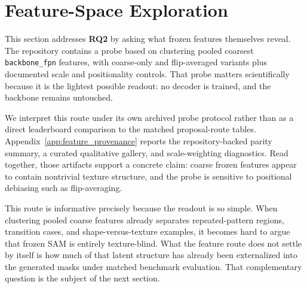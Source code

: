 \section{Feature-Space Exploration}
\label{sec:feature}

This section addresses \textbf{RQ2} by asking what frozen features themselves reveal. The repository contains a probe based on clustering pooled coarsest \texttt{backbone\_fpn} features, with coarse-only and flip-averaged variants plus documented scale and positionality controls. That probe matters scientifically because it is the lightest possible readout: no decoder is trained, and the backbone remains untouched.

We interpret this route under its own archived probe protocol rather than as a direct leaderboard comparison to the matched proposal-route tables. Appendix~\ref{app:feature_provenance} reports the repository-backed parity summary, a curated qualitative gallery, and scale-weighting diagnostics. Read together, those artifacts support a concrete claim: coarse frozen features appear to contain nontrivial texture structure, and the probe is sensitive to positional debiasing such as flip-averaging.

This route is informative precisely because the readout is so simple. When clustering pooled coarse features already separates repeated-pattern regions, transition cases, and shape-versus-texture examples, it becomes hard to argue that frozen SAM is entirely texture-blind. What the feature route does not settle by itself is how much of that latent structure has already been externalized into the generated masks under matched benchmark evaluation. That complementary question is the subject of the next section.
